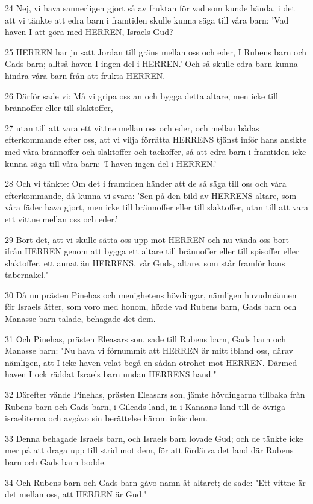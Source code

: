 \par 24 Nej, vi hava sannerligen gjort så av fruktan för vad som kunde hända, i det att vi tänkte att edra barn i framtiden skulle kunna säga till våra barn: 'Vad haven I att göra med HERREN, Israels Gud?
\par 25 HERREN har ju satt Jordan till gräns mellan oss och eder, I Rubens barn och Gads barn; alltså haven I ingen del i HERREN.' Och så skulle edra barn kunna hindra våra barn från att frukta HERREN.
\par 26 Därför sade vi: Må vi gripa oss an och bygga detta altare, men icke till brännoffer eller till slaktoffer,
\par 27 utan till att vara ett vittne mellan oss och eder, och mellan bådas efterkommande efter oss, att vi vilja förrätta HERRENS tjänst inför hans ansikte med våra brännoffer och slaktoffer och tackoffer, så att edra barn i framtiden icke kunna säga till våra barn: 'I haven ingen del i HERREN.'
\par 28 Och vi tänkte: Om det i framtiden händer att de så säga till oss och våra efterkommande, då kunna vi svara: 'Sen på den bild av HERRENS altare, som våra fäder hava gjort, men icke till brännoffer eller till slaktoffer, utan till att vara ett vittne mellan oss och eder.'
\par 29 Bort det, att vi skulle sätta oss upp mot HERREN och nu vända oss bort ifrån HERREN genom att bygga ett altare till brännoffer eller till spisoffer eller slaktoffer, ett annat än HERRENS, vår Guds, altare, som står framför hans tabernakel."
\par 30 Då nu prästen Pinehas och menighetens hövdingar, nämligen huvudmännen för Israels ätter, som voro med honom, hörde vad Rubens barn, Gads barn och Manasse barn talade, behagade det dem.
\par 31 Och Pinehas, prästen Eleasars son, sade till Rubens barn, Gads barn och Manasse barn: "Nu hava vi förnummit att HERREN är mitt ibland oss, därav nämligen, att I icke haven velat begå en sådan otrohet mot HERREN. Därmed haven I ock räddat Israels barn undan HERRENS hand."
\par 32 Därefter vände Pinehas, prästen Eleasars son, jämte hövdingarna tillbaka från Rubens barn och Gads barn, i Gileads land, in i Kanaans land till de övriga israeliterna och avgåvo sin berättelse härom inför dem.
\par 33 Denna behagade Israels barn, och Israels barn lovade Gud; och de tänkte icke mer på att draga upp till strid mot dem, för att fördärva det land där Rubens barn och Gads barn bodde.
\par 34 Och Rubens barn och Gads barn gåvo namn åt altaret; de sade: "Ett vittne är det mellan oss, att HERREN är Gud."


